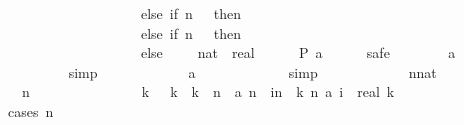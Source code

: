 \begin{isabellebody}
\ \ \ \ \ \ \ \ \ \ \ \ \ \ \ \ \ \ \ \ else\ if\ n\ {\isacharless}\ {}{}{}{}\ then\ {}\isanewline
\ \ \ \ \ \ \ \ \ \ \ \ \ \ \ \ \ \ \ \ else\ if\ n\ {\isacharequal}\ {}{}{}{}\ then\ {}\ {\isacharminus}\ {}{\isacharslash}{}{}{}{}\isanewline
\ \ \ \ \ \ \ \ \ \ \ \ \ \ \ \ \ \ \ \ else\ {}\ {\isacharminus}\ {}{\isacharslash}{}{}{}{}{\isacharcircum}{}{\isacharparenright}\ {\isacharcolon}{\isacharcolon}\ {\isacharparenleft}nat\ {\isasymRightarrow}\ real{\isacharparenright}{\isachardoublequoteclose}\isanewline
\ \ \ \ \isamarkupfalse%
\ {\isachardoublequoteopen}{\isacharquery}P\ {\isacharquery}a{\isachardoublequoteclose}\isanewline
\ \ \ \ \isamarkupfalse%
\ safe\isanewline
\ \ \ \ \ \ \isamarkupfalse%
\ {\isachardoublequoteopen}{\isacharquery}a\ {}\ {\isacharequal}\ {}{\isachardoublequoteclose}\isanewline
\ \ \ \ \ \ \ \ \isamarkupfalse%
\ simp\isanewline
\ \ \ \ \isamarkupfalse%
\isanewline
\ \ \ \ \ \ \isamarkupfalse%
\ {\isachardoublequoteopen}{\isacharquery}a\ {}\ {\isacharequal}\ {}{\isachardoublequoteclose}\isanewline
\ \ \ \ \ \ \ \ \isamarkupfalse%
\ simp\isanewline
\ \ \ \ \isamarkupfalse%
\isanewline
\ \ \ \ \ \ \isamarkupfalse%
\ n{\isacharcolon}{\isacharcolon}nat\isanewline
\ \ \ \ \ \ \isamarkupfalse%
\ {\isachardoublequoteopen}{}\ {\isasymle}\ n{\isachardoublequoteclose}\isanewline
\ \ \ \ \ \ \isanewline
\ \ \ \ \ \ \isamarkupfalse%
\ {\isachardoublequoteopen}{\isasymexists}\ k{\isachardot}\ {}\ {\isasymle}\ k\ {\isasymand}\ k\ {\isasymle}\ n\ {\isasymand}\ {\isacharquery}a\ n\ {\isacharequal}\ {\isacharparenleft}{\isasymSum}i{\isasymleftarrow}{\isacharbrackleft}n\ {\isacharminus}\ k{\isachardot}{\isachardot}{\isacharless}\ n{\isacharbrackright}{\isachardot}\ {\isacharquery}a\ i{\isacharparenright}\ {\isacharslash}\ real\ k{\isachardoublequoteclose}\isanewline
\ \ \ \ \ \ \isamarkupfalse%
\ {\isacharparenleft}cases\ {\isachardoublequoteopen}n\ {\isacharless}\ {}{}{}{}{\isachardoublequoteclose}{\isacharparenright}\isanewline
\ \ \ \ \ \ \ \ \isamarkupfalse%

\end{isabellebody}
